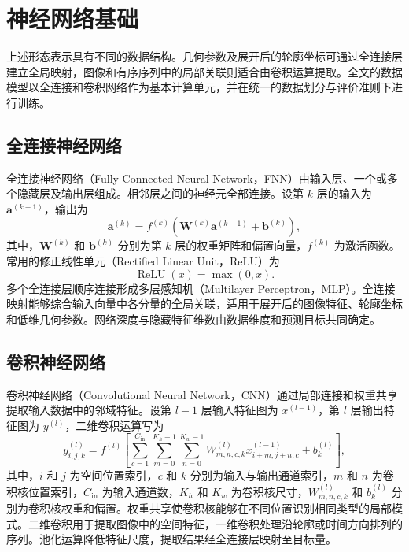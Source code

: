 \section{神经网络基础}
\label{sec:ch2_neural_network}

上述形态表示具有不同的数据结构。几何参数及展开后的轮廓坐标可通过全连接层建立全局映射，图像和有序序列中的局部关联则适合由卷积运算提取。全文的数据模型以全连接和卷积网络作为基本计算单元，并在统一的数据划分与评价准则下进行训练。

\subsection{全连接神经网络}
\label{subsec:ch2_fnn}

全连接神经网络（Fully Connected Neural Network，FNN）由输入层、一个或多个隐藏层及输出层组成。相邻层之间的神经元全部连接。设第 $k$ 层的输入为 $\boldsymbol{a}^{(k-1)}$，输出为
\begin{equation}
\boldsymbol{a}^{(k)}
=
f^{(k)}
\left(
\boldsymbol{W}^{(k)}\boldsymbol{a}^{(k-1)}
+
\boldsymbol{b}^{(k)}
\right),
\label{eq:ch2_fully_connected_layer}
\end{equation}
其中，$\boldsymbol{W}^{(k)}$ 和 $\boldsymbol{b}^{(k)}$ 分别为第 $k$ 层的权重矩阵和偏置向量，$f^{(k)}$ 为激活函数。常用的修正线性单元（Rectified Linear Unit，ReLU）为
\begin{equation}
\operatorname{ReLU}(x)
=
\max(0,x).
\label{eq:ch2_relu}
\end{equation}
多个全连接层顺序连接形成多层感知机（Multilayer Perceptron，MLP）。全连接映射能够综合输入向量中各分量的全局关联，适用于展开后的图像特征、轮廓坐标和低维几何参数。网络深度与隐藏特征维数由数据维度和预测目标共同确定\cite{lecun2015deeplearning}。

\subsection{卷积神经网络}
\label{subsec:ch2_cnn}

卷积神经网络（Convolutional Neural Network，CNN）通过局部连接和权重共享提取输入数据中的邻域特征。设第 $l-1$ 层输入特征图为 $x^{(l-1)}$，第 $l$ 层输出特征图为 $y^{(l)}$，二维卷积运算写为
\begin{equation}
y_{i,j,k}^{(l)}
=
f^{(l)}
\left[
\sum_{c=1}^{C_{\mathrm{in}}}
\sum_{m=0}^{K_h-1}
\sum_{n=0}^{K_w-1}
W_{m,n,c,k}^{(l)}
x_{i+m,j+n,c}^{(l-1)}
+
b_k^{(l)}
\right],
\label{eq:ch2_convolution}
\end{equation}
其中，$i$ 和 $j$ 为空间位置索引，$c$ 和 $k$ 分别为输入与输出通道索引，$m$ 和 $n$ 为卷积核位置索引，$C_{\mathrm{in}}$ 为输入通道数，$K_h$ 和 $K_w$ 为卷积核尺寸，$W_{m,n,c,k}^{(l)}$ 和 $b_k^{(l)}$ 分别为卷积核权重和偏置。权重共享使卷积核能够在不同位置识别相同类型的局部模式。二维卷积用于提取图像中的空间特征，一维卷积处理沿轮廓或时间方向排列的序列。池化运算降低特征尺度，提取结果经全连接层映射至目标量\cite{krizhevsky2012imagenet,lecun2015deeplearning}。


